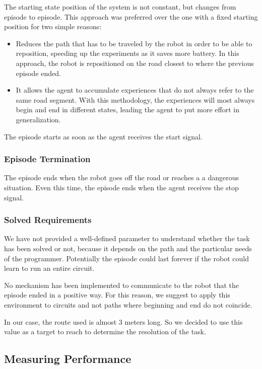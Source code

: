 The starting state position of the system is not constant, but changes from episode to episode.
This approach was preferred over the one with a fixed starting position for two simple reasons:
\begin{itemize}
	\item Reduces the path that has to be traveled by the robot in order to be able to reposition, speeding up the experiments as it saves more battery.
	      In this approach, the robot is repositioned on the road closest to where the previous episode ended.
	\item It allows the agent to accumulate experiences that do not always refer to the same road segment.
	      With this methodology, the experiences will most always begin and end in different states, leading the agent to put more effort in generalization.
\end{itemize}

The episode starts as soon as the agent receives the start signal.

\subsubsection{Episode Termination}

The episode ends when the robot goes off the road or reaches a a dangerous situation.
Even this time, the episode ends when the agent receives the stop signal.

\subsubsection{Solved Requirements}

We have not provided a well-defined parameter to understand whether the task has been solved or not, because it depends on the path and the particular needs of the programmer.
Potentially the episode could last forever if the robot could learn to run an entire circuit.

No mechanism has been implemented to communicate to the robot that the episode ended in a positive way.
For this reason, we suggest to apply this environment to circuits and not paths where beginning and end do not coincide.

In our case, the route used is almost 3 meters long.
So we decided to use this value as a target to reach to determine the resolution of the task.

\subsection{Measuring Performance}

